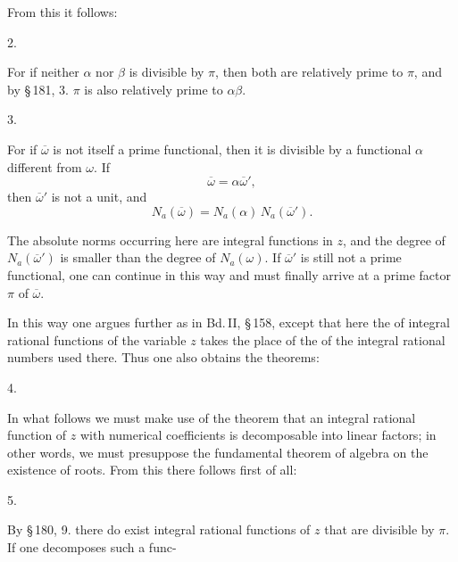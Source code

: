 From this it follows:

2. 

For if neither $\alpha$ nor $\beta$ is divisible by $\pi$, then both are relatively prime to $\pi$, and by \S\,181, 3. $\pi$ is also relatively prime to $\alpha\beta$.

3. 

For if $\overline{\omega}$ is not itself a prime functional, then it is divisible by a functional $\alpha$ different from $\omega$. %
If
\[
\overline{\omega} = \alpha \overline{\omega}',
\]
then $\overline{\omega}'$ is not a unit, and
\[
N_a(\overline{\omega}) = N_a(\alpha)\, N_a(\overline{\omega}').
\]

The absolute norms occurring here are integral functions in $z$, and the degree of $N_a(\overline{\omega}')$ is smaller than the degree of $N_a(\omega)$. %
If $\overline{\omega}'$ is still not a prime functional, one can continue in this way and must finally arrive at a prime factor $\pi$ of $\overline{\omega}$.

In this way one argues further as in Bd.\,II, \S\,158, except that here the  of integral rational functions of the variable $z$ takes the place of the  of the integral rational numbers used there. Thus one also obtains the theorems:

4. 

In what follows we must make use of the theorem that an integral rational function of $z$ with numerical coefficients is decomposable into linear factors; in other words, we must presuppose the fundamental theorem of algebra on the existence of roots. From this there follows first of all:

5. 

By \S\,180, 9. there do exist integral %
rational functions of $z$ that are divisible by $\pi$. If one decomposes such a func-
